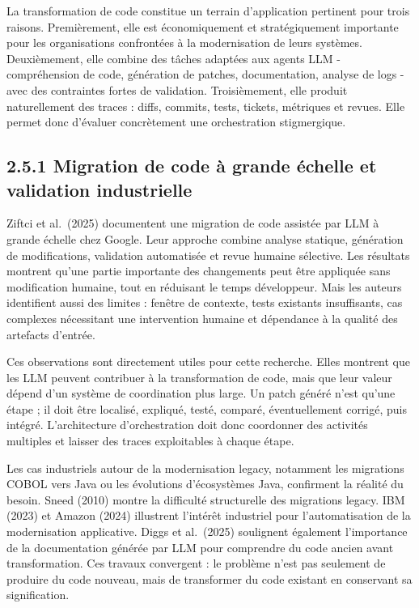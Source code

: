 La transformation de code constitue un terrain d'application pertinent pour trois raisons. Premièrement, elle est économiquement et stratégiquement importante pour les organisations confrontées à la modernisation de leurs systèmes. Deuxièmement, elle combine des tâches adaptées aux agents LLM - compréhension de code, génération de patches, documentation, analyse de logs - avec des contraintes fortes de validation. Troisièmement, elle produit naturellement des traces : diffs, commits, tests, tickets, métriques et revues. Elle permet donc d'évaluer concrètement une orchestration stigmergique.

\subsection{2.5.1 Migration de code à grande échelle et validation industrielle}\label{migration-de-code-uxe0-grande-uxe9chelle-et-validation-industrielle}

Ziftci et al.~(2025) documentent une migration de code assistée par LLM à grande échelle chez Google. Leur approche combine analyse statique, génération de modifications, validation automatisée et revue humaine sélective. Les résultats montrent qu'une partie importante des changements peut être appliquée sans modification humaine, tout en réduisant le temps développeur. Mais les auteurs identifient aussi des limites : fenêtre de contexte, tests existants insuffisants, cas complexes nécessitant une intervention humaine et dépendance à la qualité des artefacts d'entrée.

Ces observations sont directement utiles pour cette recherche. Elles montrent que les LLM peuvent contribuer à la transformation de code, mais que leur valeur dépend d'un système de coordination plus large. Un patch généré n'est qu'une étape ; il doit être localisé, expliqué, testé, comparé, éventuellement corrigé, puis intégré. L'architecture d'orchestration doit donc coordonner des activités multiples et laisser des traces exploitables à chaque étape.

Les cas industriels autour de la modernisation legacy, notamment les migrations COBOL vers Java ou les évolutions d'écosystèmes Java, confirment la réalité du besoin. Sneed (2010) montre la difficulté structurelle des migrations legacy. IBM (2023) et Amazon (2024) illustrent l'intérêt industriel pour l'automatisation de la modernisation applicative. Diggs et al.~(2025) soulignent également l'importance de la documentation générée par LLM pour comprendre du code ancien avant transformation. Ces travaux convergent : le problème n'est pas seulement de produire du code nouveau, mais de transformer du code existant en conservant sa signification.

